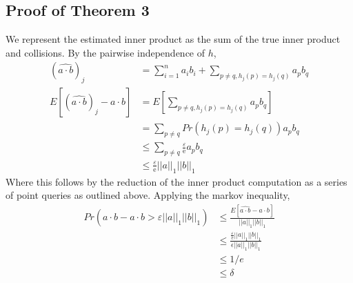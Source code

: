 \documentclass[11pt]{article}
\begin{document}
	\subsection{Proof of Theorem 3}
		We represent the estimated inner product as the sum of the true inner product and collisions. By the pairwise independence of $h$,
		\begin{align}
		(\widehat{a \cdot b})_j &= \sum_{i=1}^n a_ib_i + \sum_{p \neq q, h_j(p)=h_j(q)} a_pb_q \\
		E\left[(\widehat{a \cdot b})_j - a \cdot b\right] &= E\left[\sum_{p \neq q, h_j(p)=h_j(q)} a_pb_q\right] \\
		&= \sum_{p \neq q}Pr(h_j(p) = h_j(q))a_pb_q \\
		&\leq \sum_{p \neq q} \frac{\varepsilon}{\mathrm{e}}a_pb_q \\
		&\leq \frac{\varepsilon}{\mathrm e}||a||_1||b||_1
		\end{align}
		Where this follows by the reduction of the inner product computation as a series of point queries as outlined above. Applying the markov inequality,
		\begin{align}
		Pr(\widehat{a \cdot b} - a \cdot b > \varepsilon ||a||_1||b||_1) &\leq \frac{E[\widehat{a \cdot b} - a \cdot b]}{||a||_1||b||_1} \\
		&\leq \frac{\frac{\varepsilon}{\mathrm e}||a||_1||b||_1}{\epsilon||a||_1||b||_1} \\
		& \leq 1/e \\
		&\leq \delta
		\end{align}
\end{document}
